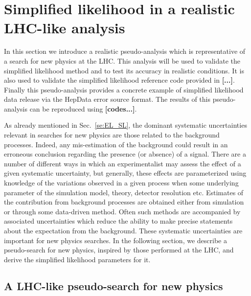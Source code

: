 \documentclass[11pt]{article}
\begin{document}
\section{Simplified likelihood in a  realistic LHC-like analysis }
\label{se:SL_LHC}


In this section we introduce a realistic pseudo-analysis  which is representative of a search for new physics at the LHC. This analysis will be used to validate the simplified likelihood method and to test  its accuracy in realistic conditions. It is also used to validate the simplified likelihood reference code provided in \textbf{[...]}. 
 Finally this pseudo-analysis  provides a concrete example  of  simplified likelihood data release via the HepData error source format. 
The results of this pseudo-analysis can be reproduced using \textbf{[codes...]}.





As already mentioned in Sec.~\ref{se:EL_SL}, the dominant systematic uncertainties relevant in searches for new physics are those related to the background processes. Indeed, any mis-estimation of the background could result in an erroneous conclusion regarding the presence (or absence) of a signal.
There are a number of different ways in which an experimentalist may assess the effect of a given systematic uncertainty, but generally, these effects are parameterized using knowledge of the variations observed in a given process when some underlying parameter of the simulation model, theory, detector resolution etc. Estimates of the contribution from background processes are obtained either from simulation or through some data-driven method. Often such methods are accompanied by associated  uncertainties which reduce the ability to make precise statements about the expectation from the background.
These systematic uncertainties are important for new physics searches. In the following section, we describe a pseudo-search for new physics, inspired by those performed at the LHC, and derive the simplified likelihood parameters for it.






\subsection{A LHC-like pseudo-search for new physics}
\label{se:toy_search}
\end{document}
